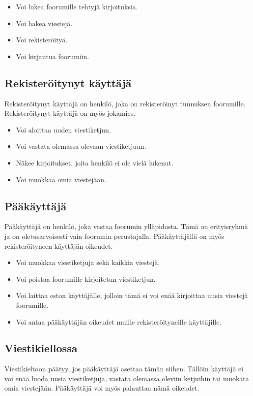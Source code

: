 \documentclass[a4paper, 12pt, finnish]{article}
\begin{document}
\begin{itemize}
\item
Voi lukea foorumille tehtyjä kirjoituksia.

\item
Voi hakea viestejä.

\item
Voi rekisteröityä.

\item
Voi kirjautua foorumiin.
\end{itemize}

\subsection{Rekisteröitynyt käyttäjä}
Rekisteröitynyt käyttäjä on henkilö, joka on rekisteröinyt tunnuksen foorumille.
Rekisteröitynyt käyttäjä on myös jokamies.

\begin{itemize}
\item
    Voi aloittaa uuden viestiketjun.
\item
    Voi vastata olemassa olevaan viestiketjuun.
\item
    Näkee kirjoitukset, joita henkilö ei ole vielä lukenut.
\item
    Voi muokkaa omia viestejään.
\end{itemize}

\subsection{Pääkäyttäjä}
Pääkäyttäjä on henkilö, joka vastaa foorumin ylläpidosta.
Tämä on erityisryhmä ja on oletusarvoisesti vain foorumin perustajalla. Pääkäyttäjällä on myös rekisteröityneen käyttäjän oikeudet.

\begin{itemize}
\item
Voi muokkaa viestiketjuja sekä kaikkia viestejä.
\item
Voi poistaa foorumille kirjoitetun viestiketjun.
\item
Voi laittaa eston käyttäjälle, jolloin tämä ei voi enää kirjoittaa uusia viestejä foorumille.
\item
Voi antaa pääkäyttäjän oikeudet muille rekisteröityneille käyttäjille.
\end{itemize}

\subsection{Viestikiellossa}
Viestikieltoon päätyy, jos pääkäyttäjä asettaa tämän siihen.
Tällöin käyttäjä ei voi enää luoda uusia viestiketjuja, vastata olemassa oleviin ketjuihin tai muokata omia viestejään.
Pääkäyttäjä voi myös palauttaa nämä oikeudet.
\end{document}
